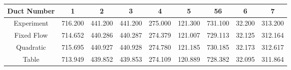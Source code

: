 \begin{center}
\begin{tabular}{|c|c|c|c|c|c|c|c|c|} \hline
Duct Number & 1 & 2 & 3 & 4 & 5 & 56 & 6 & 7 \\ \hline
Experiment &
716.200 & 441.200 & 441.200 & 275.000 & 121.300 & 731.100 & 32.200 & 313.200 \\
Fixed Flow & 714.652 & 440.286 & 440.287 & 274.379 & 121.007 & 729.113 & 32.125 & 312.164 \\
Quadratic & 715.695 & 440.927 & 440.928 & 274.780 & 121.185 & 730.185 & 32.173 & 312.617 \\
Table & 713.949 & 439.852 & 439.853 & 274.109 & 120.889 & 728.382 & 32.095 & 311.864 \\
\hline
\end{tabular}
\end{center}
